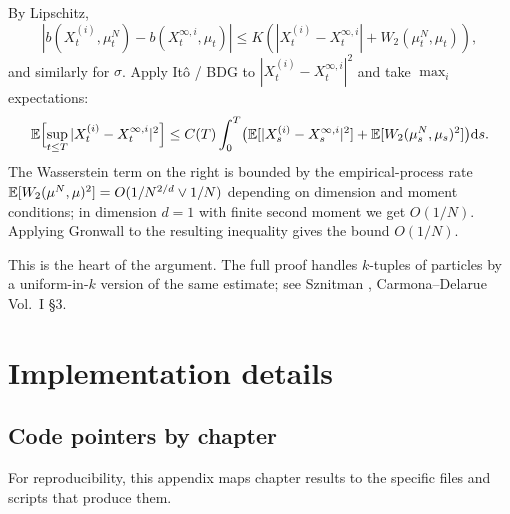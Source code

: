 By Lipschitz,
\begin{equation}
  |b(X^{(i)}_t, \mu^N_t) - b(X^{\infty, i}_t, \mu_t)| \leq K (|X^{(i)}_t - X^{\infty, i}_t| + W_2(\mu^N_t, \mu_t)),
\end{equation}
and similarly for $\sigma$. Apply It\^o / BDG to $|X^{(i)}_t - X^{\infty, i}_t|^2$ and take $\max_i$ expectations:
\begin{equation}
  \mathbb{E}\Bigl[\sup_{t \leq T} |X^{(i)}_t - X^{\infty, i}_t|^2\Bigr] \leq C(T) \int_0^T \bigl(\mathbb{E}[|X^{(i)}_s - X^{\infty, i}_s|^2] + \mathbb{E}[W_2(\mu^N_s, \mu_s)^2]\bigr) \mathrm{d} s.
\end{equation}
The Wasserstein term on the right is bounded by the empirical-process rate $\mathbb{E}[W_2(\mu^N, \mu)^2] = O(1/N^{2/d} \vee 1/N)$ depending on dimension and moment conditions; in dimension $d = 1$ with finite second moment we get $O(1/N)$. Applying Gronwall to the resulting inequality gives the bound $O(1/N)$.

This is the heart of the argument. The full proof handles $k$-tuples of particles by a uniform-in-$k$ version of the same estimate; see Sznitman \cite{sznitman1991}, Carmona--Delarue \cite{carmona2018} Vol.~I \S3.

\chapter{Implementation details}
\label{app:implementation}

\section{Code pointers by chapter}

For reproducibility, this appendix maps chapter results to the specific files and scripts that produce them.

